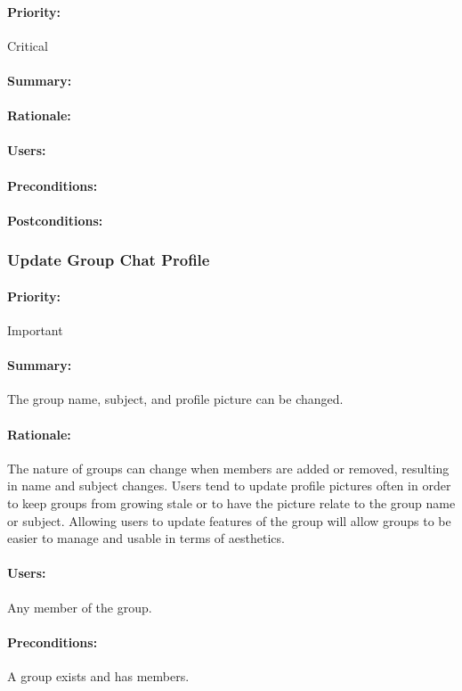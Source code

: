 \documentclass[11pt]{article}
\begin{document}
\paragraph{Priority:}Critical
\paragraph{Summary:}
\paragraph{Rationale:}
\paragraph{Users:}
\paragraph{Preconditions:}
\paragraph{{Postconditions:}}
\subsubsection{Update Group Chat Profile} \label{UC-update-group}
\paragraph{Priority:} Important
\paragraph{Summary:}
The group name, subject, and profile picture can be changed.
\paragraph{Rationale:}
The nature of groups can change when members are added or removed, resulting in name and subject changes. Users tend to update profile pictures often in order to keep groups from growing stale or to have the picture relate to the group name or subject. Allowing users to update features of the group will allow groups to be easier to manage and usable in terms of aesthetics.
\paragraph{Users:}
Any member of the group.
\paragraph{Preconditions:}
A group exists and has members.
\end{document}
